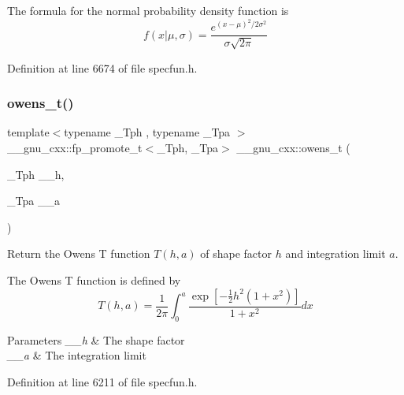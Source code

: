 The formula for the normal probability density function is \[ f(x|\mu,\sigma) = \frac{e^{(x-\mu)^2/2\sigma^2}}{\sigma\sqrt{2\pi}} \] 

Definition at line 6674 of file specfun.\+h.

\mbox{\label{group__gnu__math__spec__func_gab4e367aae19853cca3af99eead01fcaa}} 
\subsubsection{\texorpdfstring{owens\+\_\+t()}{owens\_t()}}
{\footnotesize\ttfamily template$<$typename \+\_\+\+Tph , typename \+\_\+\+Tpa $>$ \\
\+\_\+\+\_\+gnu\+\_\+cxx\+::fp\+\_\+promote\+\_\+t$<$\+\_\+\+Tph, \+\_\+\+Tpa$>$ \+\_\+\+\_\+gnu\+\_\+cxx\+::owens\+\_\+t (\begin{DoxyParamCaption}\item[{\+\_\+\+Tph}]{\+\_\+\+\_\+h,  }\item[{\+\_\+\+Tpa}]{\+\_\+\+\_\+a }\end{DoxyParamCaption})\hspace{0.3cm}{\ttfamily [inline]}}

Return the Owens T function $ T(h,a) $ of shape factor $ h $ and integration limit $ a $.

The Owens T function is defined by \[ T(h,a) = \frac{1}{2\pi}\int_0^a \frac{\exp\left[-\frac{1}{2}h^2(1+x^2)\right]}{1+x^2} dx \]


\begin{DoxyParams}{Parameters}
{\em \+\_\+\+\_\+h} & The shape factor \\
\hline
{\em \+\_\+\+\_\+a} & The integration limit \\
\hline
\end{DoxyParams}


Definition at line 6211 of file specfun.\+h.

\mbox{\label{group__gnu__math__spec__func_gac24d32e9b072c4953654d5559f992871}} 
